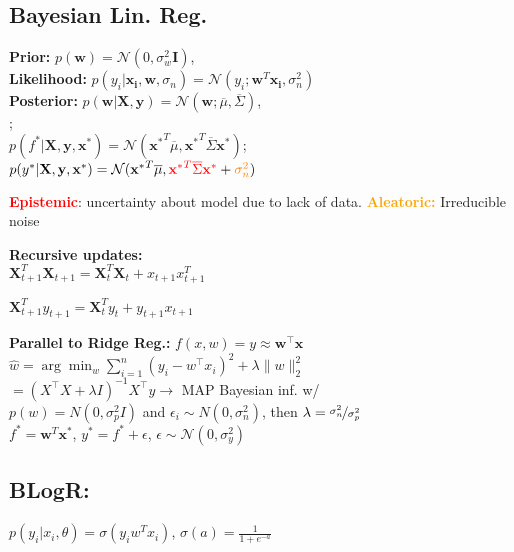 
\subsection*{Bayesian Lin. Reg.}
\textbf{Prior:} \; $p(\mathbf{w}) = \mathcal{N}(0, \sigma_w^2 \mathbf{I})$, \\ 
\textbf{Likelihood:} \; $p(y_i|\mathbf{x_i}, \mathbf{w}, \sigma_n) = \mathcal{N}(y_i; \mathbf{w}^T\mathbf{x_i}, \sigma_n^2)$ \\
\textbf{Posterior:} \; $p(\mathbf{w} | \mathbf{X, y}) = \mathcal{N}(\mathbf{w}; \overline{\mu}, \overline{\Sigma})$, \\
; \\
$p(f^* | \mathbf{X,y,x^{*}}) = \mathcal{N}(\mathbf{x^*}^T\overline{\mu}, {\mathbf{x}^*}^T \overline{\Sigma} \mathbf{x}^{*})$; \\
$p(y^* | \mathbf{X,y,x^{*}}) = \mathcal{N}({\mathbf{x}^{*}}^T \overline{\mu}, \textcolor{red}{{\mathbf{x}^{*}}^T \overline{\Sigma} \mathbf{x}^*} + \textcolor{orange}{\sigma_n^2})$

\textcolor{red}{\textbf{Epistemic}}: uncertainty about model due to lack of data. \; \textcolor{orange}{\textbf{Aleatoric:}} Irreducible noise

\textbf{Recursive updates:} \\ $\mathbf{X}_{t+1}^T \mathbf{X}_{t+1} = \mathbf{X}_{t}^T \mathbf{X}_{t} + x_{t+1} x_{t+1}^T$

$\mathbf{X}_{t+1}^T y_{t+1} = \mathbf{X}_{t}^T y_{t} + y_{t+1} x_{t+1}$

\textbf{Parallel to Ridge Reg.: } \;
$f(x,w) = y \approx \mathbf{w}^\top \mathbf{x}$ \\ 
$\hat{w} = \arg\min_{w}\sum_{i=1}^{n}(y_i - w^\top x_i)^2 + \lambda \|w\|_2^2$ \\ 
$= (X^{\top} X + \lambda I)^{-1}X^{\top} y \rightarrow$ MAP Bayesian inf. w/\\
$p(w) = N(0, \sigma_p^2 I)$ and $\epsilon_i \sim N(0, \sigma_n^2)$, then $\lambda = \nicefrac{\sigma_n^2}{\sigma_p^2}$ \\
$f^{*} = \mathbf{w}^T\mathbf{x}^{*}$, $y^{*} = f^{*} + \epsilon$, $\epsilon \sim \mathcal{N}(0, \sigma_y^2)$

\vspace*{-0.8mm}
\subsection*{BLogR:} \; $p(y_i | x_i, \theta) = \sigma(y_i w^T x_i)$, \; $\sigma(a) = \frac{1}{1 + e^{-a}}$

